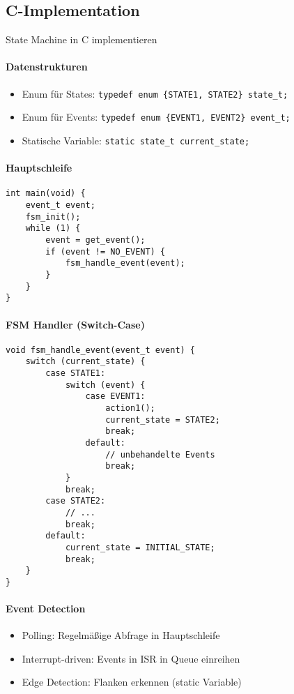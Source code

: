 \subsection{C-Implementation}

\begin{KR}{State Machine in C implementieren}\\
    \paragraph{Datenstrukturen}
    \begin{itemize}
        \item Enum für States: \texttt{typedef enum \{STATE1, STATE2\} state\_t;}
        \item Enum für Events: \texttt{typedef enum \{EVENT1, EVENT2\} event\_t;}
        \item Statische Variable: \texttt{static state\_t current\_state;}
    \end{itemize}
    
    \paragraph{Hauptschleife}
\begin{lstlisting}[style=basesmol]
int main(void) {
    event_t event;
    fsm_init();
    while (1) {
        event = get_event();
        if (event != NO_EVENT) {
            fsm_handle_event(event);
        }
    }
}
\end{lstlisting}
    
    \paragraph{FSM Handler (Switch-Case)}
\begin{lstlisting}[style=basesmol]
void fsm_handle_event(event_t event) {
    switch (current_state) {
        case STATE1:
            switch (event) {
                case EVENT1:
                    action1();
                    current_state = STATE2;
                    break;
                default:
                    // unbehandelte Events
                    break;
            }
            break;
        case STATE2:
            // ...
            break;
        default:
            current_state = INITIAL_STATE;
            break;
    }
}
\end{lstlisting}
    
    \paragraph{Event Detection}
    \begin{itemize}
        \item Polling: Regelmäßige Abfrage in Hauptschleife
        \item Interrupt-driven: Events in ISR in Queue einreihen
        \item Edge Detection: Flanken erkennen (static Variable)
    \end{itemize}
\end{KR}

